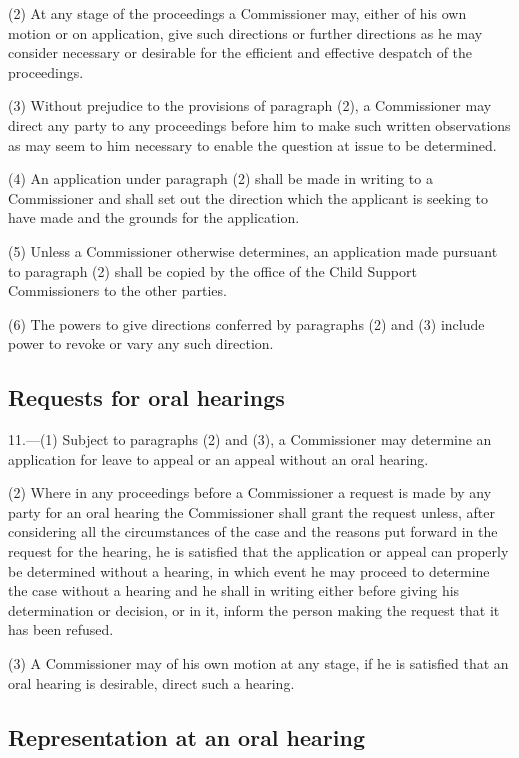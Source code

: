 \documentclass[12pt,a4paper]{article}
\begin{document}
(2) At any stage of the proceedings a Commissioner may, either of his own motion or on application, give such directions or further directions as he may consider necessary or desirable for the efficient and effective despatch of the proceedings.

(3) Without prejudice to the provisions of paragraph (2), a Commissioner may direct any party to any proceedings before him to make such written observations as may seem to him necessary to enable the question at issue to be determined.

(4) An application under paragraph (2) shall be made in writing to a Commissioner and shall set out the direction which the applicant is seeking to have made and the grounds for the application.

(5) Unless a Commissioner otherwise determines, an application made pursuant to paragraph (2) shall be copied by the office of the Child Support Commissioners to the other parties.

(6) The powers to give directions conferred by paragraphs (2) and (3) include power to revoke or vary any such direction.

\subsection[11. Requests for oral hearings]{Requests for oral hearings}

11.—(1) Subject to paragraphs (2) and (3), a Commissioner may determine an application for leave to appeal or an appeal without an oral hearing.

(2) Where in any proceedings before a Commissioner a request is made by any party for an oral hearing the Commissioner shall grant the request unless, after considering all the circumstances of the case and the reasons put forward in the request for the hearing, he is satisfied that the application or appeal can properly be determined without a hearing, in which event he may proceed to determine the case without a hearing and he shall in writing either before giving his determination or decision, or in it, inform the person making the request that it has been refused.

(3) A Commissioner may of his own motion at any stage, if he is satisfied that an oral hearing is desirable, direct such a hearing.

\subsection[12. Representation at an oral hearing]{Representation at an oral hearing}
\end{document}
